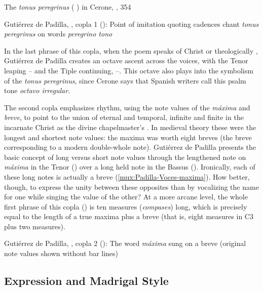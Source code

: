 {The \emph{tonus peregrinus} ( ) in Cerone, , 354}

{Gutiérrez de Padilla, , copla 1
(): Point of imitation quoting cadences chant \emph{tonus
peregrinus} on words \emph{peregrino tono}}

In the last phrase of this copla, when the poem speaks of Christ  or theologically , Gutiérrez
de Padilla creates an octave ascent across the voices, with the Tenor leaping
-- and the Tiple continuing, --.
This octave also plays into the symbolism of the \emph{tonus peregrinus}, since
Cerone says that Spanish writers call this  psalm tone
\emph{octavo irregular}.%
    \Autocite[354]{Cerone:Melopeo}

The second copla emphasizes rhythm, using the note values of the \emph{máxima}
and \emph{breve}, to point to the union of eternal and temporal, infinite and
finite in the incarnate Christ as the divine chapelmaster's
.
In medieval theory these were the longest and shortest note values: the maxima
was worth eight breves (the breve corresponding to a modern double-whole note).
Gutiérrez de Padilla presents the basic concept of long versus short note values
through the lengthened note on \emph{máxima} in the Tenor ()
over a long held note in the Bassus ().
Ironically, each of these long notes is actually a breve
(\cref{mux:Padilla-Voces-maxima}).
How better, though, to express the unity between these opposites than by
vocalizing the name for one while singing the value of the other?
At a more arcane level, the whole first phrase of this copla
() is ten measures (\emph{compases}) long, which is precisely
equal to the length of a true maxima plus a breve (that is, eight measures in C3
plus two measures).

{Gutiérrez de Padilla, , copla 2
(): The word \emph{máxima} sung on a breve (original note
values shown without bar lines)}

\subsection{Expression and Madrigal Style}

